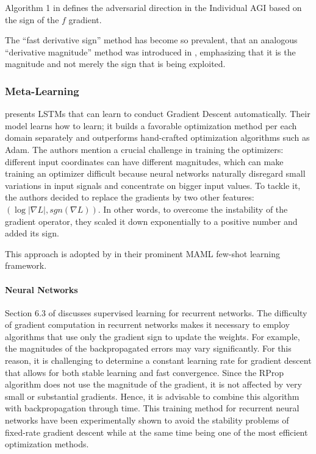 \documentclass[11pt]{book}
\begin{document}
Algorithm 1 in \cite{pan2021explaining} defines the adversarial direction
in the Individual AGI based on the sign of the $f$ gradient.

The ``fast derivative sign'' method has become so prevalent, that
an analogous ``derivative magnitude'' method was introduced in \cite{rozsa2016adversarial},
emphasizing that it is the magnitude and not merely the sign that
is being exploited.


\subsubsection{Meta-Learning}

\cite{andrychowicz2016learning} presents LSTMs that can learn to
conduct Gradient Descent automatically. Their model learns how to
learn; it builds a favorable optimization method per each domain separately
and outperforms hand-crafted optimization algorithms such as Adam.
The authors mention a crucial challenge in training the optimizers:
different input coordinates can have different magnitudes, which can
make training an optimizer difficult because neural networks naturally
disregard small variations in input signals and concentrate on bigger
input values. To tackle it, the authors decided to replace the gradients
by two other features: $\left(\log\left|\nabla L\right|,sgn\left(\nabla L\right)\right)$.
In other words, to overcome the instability of the gradient operator,
they scaled it down exponentially to a positive number and added its
sign.

This approach is adopted by \cite{ravi2016optimization} in their
prominent MAML few-shot learning framework.

\paragraph{Neural Networks}

Section 6.3 of \cite{behnke2003hierarchical} discusses supervised
learning for recurrent networks. The difficulty of gradient computation
in recurrent networks makes it necessary to employ algorithms that
use only the gradient sign to update the weights. For example, the
magnitudes of the backpropagated errors may vary significantly. For
this reason, it is challenging to determine a constant learning rate
for gradient descent that allows for both stable learning and fast
convergence. Since the RProp algorithm does not use the magnitude
of the gradient, it is not affected by very small or substantial gradients.
Hence, it is advisable to combine this algorithm with backpropagation
through time. This training method for recurrent neural networks have
been experimentally shown to avoid the stability problems of fixed-rate
gradient descent while at the same time being one of the most efficient
optimization methods.
\end{document}
